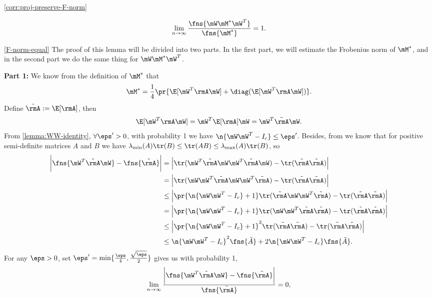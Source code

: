 \begin{proofof}{\cref{corr:proj-preserve-F-norm}}
\begin{lemma}
\label{F-norm-equal}
\[\lim_{n\to\infty}\frac{\fns{\mW\mM^*\mW^T}}{\fns{\mM^*}}=1.\]
\end{lemma}
\begin{proofof}{\cref{F-norm-equal}}
The proof of this lemma will be divided into two parts. In the first part, we will estimate the Frobenius norm of $\mM^*$, and in the second part we do the same thing for $\mW\mM^*\mW^T$.

\textbf{Part 1:} We know from the definition of $\mM^*$ that
\begin{equation}
\label{lemma:M-star}
\mM^*=\frac14\pr{\E[\mW^T\rmA\mW]+\diag(\E[\mW^T\rmA\mW])}.
\end{equation}
Define $\tilde{\rmA}:=\E[\rmA]$, then
\begin{equation}
\E[\mW^T\rmA\mW] = \mW^T\E[\rmA]\mW = \mW^T\tilde{\rmA}\mW.
\end{equation}
From \cref{lemma:WW-identity}, $\forall\eps'>0$, with probability 1 we have $\n{\mW\mW^T-I_c}\leq\eps'$. Besides, from \cite{kleinman1968design} we know that for positive semi-definite matrices $A$ and $B$ we have $\lambda_{\min}(A)\tr(B)\leq \tr(AB)\leq \lambda_{\max}(A)\tr(B)$, so
\begin{equation}
\begin{split}
    \bigg|\fns{\mW^T\tilde{\rmA}\mW} - \fns{\tilde{\rmA}}\bigg|
    &=\Big|\tr(\mW^T\tilde{\rmA}\mW\mW^T\tilde{\rmA}\mW)-\tr(\tilde{\rmA}\tilde{\rmA})\Big|\\
    &=\Big|\tr(\mW\mW^T\tilde{\rmA}\mW\mW^T\tilde{\rmA})-\tr(\tilde{\rmA}\tilde{\rmA})\Big|\\
    &\leq\Big|\pr{\n{\mW\mW^T-I_c}+1}\tr(\tilde{\rmA}\mW\mW^T\tilde{\rmA})-\tr(\tilde{\rmA}\tilde{\rmA})\Big|\\
    &=\Big|\pr{\n{\mW\mW^T-I_c}+1}\tr(\mW\mW^T\tilde{\rmA}\tilde{\rmA})-\tr(\tilde{\rmA}\tilde{\rmA})\Big|\\
    &\leq\Big|\pr{\n{\mW\mW^T-I_c}+1}^2\tr(\tilde{\rmA}\tilde{\rmA})-\tr(\tilde{\rmA}\tilde{\rmA})\Big|\\
    &\leq\n{\mW\mW^T-I_c}^2\fns{\tilde{A}} + 2\n{\mW\mW^T-I_c}\fns{\tilde{A}}.
\end{split}
\end{equation}
For any $\eps>0$, set $\eps'=\min\{\frac{\eps}{4},\frac{\sqrt{\eps}}{2}\}$ gives us with probability 1,
\begin{equation}
    \lim_{n\to\infty}\frac{\bigg|\fns{\mW^T\tilde{\rmA}\mW} - \fns{\tilde{\rmA}}\bigg|}{\fns{\tilde{\rmA}}}=0,
\end{equation}

\end{proofof}
\end{proofof}

